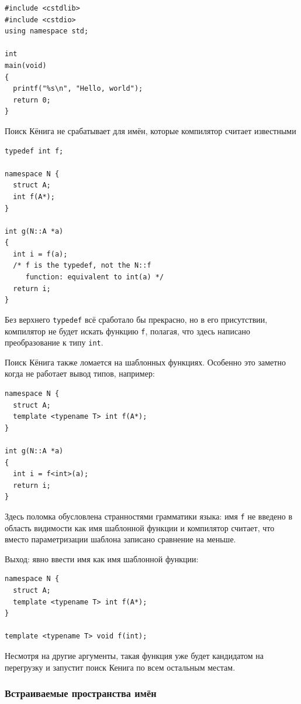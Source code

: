 \documentclass[a4paper,12pt,oneside]{article}
\begin{document}
\begin{lstlisting}
#include <cstdlib>
#include <cstdio>
using namespace std;

int 
main(void)
{
  printf("%s\n", "Hello, world");
  return 0;
}
\end{lstlisting}

Поиск Кёнига не срабатывает для имён, которые компилятор считает известными

\begin{lstlisting}
typedef int f;

namespace N {
  struct A;
  int f(A*);
}

int g(N::A *a)
{
  int i = f(a);
  /* f is the typedef, not the N::f
     function: equivalent to int(a) */
  return i;
}
\end{lstlisting}

Без верхнего \lstinline!typedef! всё сработало бы прекрасно, но в его присутствии, компилятор не будет искать функцию \lstinline!f!, полагая, что здесь написано преобразование к типу \lstinline!int!.

Поиск Кёнига также ломается на шаблонных функциях. Особенно это заметно когда не работает вывод типов, например:

\begin{lstlisting}
namespace N {
  struct A;
  template <typename T> int f(A*);
}

int g(N::A *a)
{
  int i = f<int>(a);
  return i;
}
\end{lstlisting}

Здесь поломка обусловлена странностями грамматики языка: имя \lstinline!f! не введено в область видимости как имя шаблонной функции и компилятор считает, что вместо параметризации шаблона записано сравнение на меньше.

Выход: явно ввести имя как имя шаблонной функции:

\begin{lstlisting}
namespace N {
  struct A;
  template <typename T> int f(A*);
}

template <typename T> void f(int);
\end{lstlisting}

Несмотря на другие аргументы, такая функция уже будет кандидатом на перегрузку и запустит поиск Кенига по всем остальным местам.

\subsubsection{Встраиваемые пространства имён}\label{InlineNameSpaces}
\end{document}
